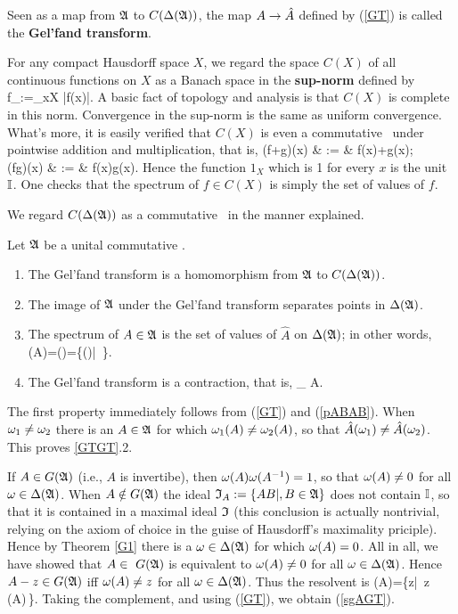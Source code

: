 Seen as a map from ${\frak A}$ to $C(\Delta({\frak A}))$, the map $A\rightarrow\hat{A}$ defined by
(\ref{GT}) is called the {\bf Gel'fand transform}.
 
For any compact Hausdorff space $X$, we regard the space $C(X)$ of all
continuous functions on $X$ as a Banach space in the {\bf sup-norm}
defined by \be \n f\n_{\infty}:=\sup_{x\in X} |f(x)|.  
\ee A basic fact of topology and analysis is that $C(X)$ is complete
in this norm.  Convergence in the sup-norm is the same as uniform
convergence.  What's more, it is easily verified that $C(X)$ is even a
commutative \BA\ under pointwise addition and multiplication, that is,
\bea (\lm f+\mu g)(x) & := & \lm f(x)+\mu g(x); \nn \\ (fg)(x) & := &
f(x)g(x).  \eea Hence the function $1_X$ which is 1 for every
$x$ is the unit ${\Bbb I}$.  One checks that the spectrum of $f\in C(X)$ is
simply the set of values of $f$.

We regard $C(\Delta({\frak A}))$ as a commutative \BA\ in the manner explained.
\begin{Theorem} Let ${\frak A}$ be a unital commutative \BA.
\begin{enumerate}
\item
The Gel'fand transform is a homomorphism from ${\frak A}$ to $C(\Delta({\frak A}))$.
\item
The image of ${\frak A}$ under the Gel'fand transform separates points in
$\Delta({\frak A})$.
\item
The spectrum of $A\in{\frak A}$ is the set of values of $\hat{A}$ on $\Delta({\frak A})$;
in other words, \be \sg(A)=\sg()=\{(\om)|\,
\om\in\DA\}. \ee
\item
The Gel'fand transform is a contraction, that is, \be
\n{}\n_{\infty}\,\leq\,\n A\n.  \ee
\end{enumerate} \end{Theorem}

The first property immediately follows from (\ref{GT}) and
(\ref{pABAB}).  When $\omega_1\neq\omega_2$ there is an $A\in{\frak A}$ for which
$\omega_1(A)\neq \omega_2(A)$, so that $\hat{A}(\omega_1)\neq
\hat{A}(\omega_2)$. This proves \ref{GTGT}.2.

If $A\in G({\frak A})$ (i.e., $A$ is invertibe), then $\omega(A)\omega(A^{-1})=1$,
so that $\omega(A)\neq 0$ for all $\omega\in\Delta({\frak A})$. When $A\notin G({\frak A})$ the
ideal ${\frak I}_A:=\{AB|, B\in{\frak A}\}$ does not contain ${\Bbb I}$, so that it is
contained in a maximal ideal ${\frak I}$ (this conclusion is actually
nontrivial, relying on the axiom of choice in the guise of Hausdorff's
maximality priciple).  Hence by Theorem \ref{G1} there is a
$\omega\in\Delta({\frak A})$ for which $\omega(A)=0$.  All in all, we have showed that
$A\in\ G({\frak A})$ is equivalent to $\omega(A)\neq 0$ for all
$\omega\in\Delta({\frak A})$. Hence $A-z\in G({\frak A})$ iff $\omega(A)\neq z$ for all
$\omega\in\Delta({\frak A})$. Thus the resolvent is \be \om(A)=\{z\in\C|\, z\neq
\om(A)\,\forall\om\in\DA\}.  \ee Taking the complement, and using
(\ref{GT}), we obtain (\ref{sgAGT}).

